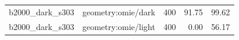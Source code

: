 \begin{longtable}{l>{\raggedright\arraybackslash}p{.42\linewidth}rrr}
b2000\_\allowbreak{}dark\_\allowbreak{}s303 & %
geometry:omie/dark & %
400 & %
91.75 & %
99.62 \\ %

b2000\_\allowbreak{}dark\_\allowbreak{}s303 & %
geometry:omie/light & %
400 & %
0.00 & %
56.17 \\ %


\end{longtable}
